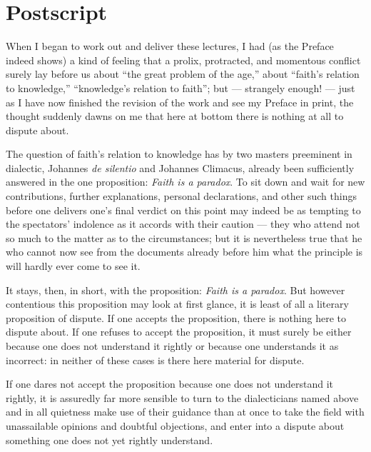 \documentclass[12pt,a4paper]{book}
\begin{document}
\chapter*{Postscript}
\label{ch:efterskrift}

\begingroup\small

When I began to work out and deliver these lectures, I had (as the Preface indeed shows) a kind of
feeling that a prolix, protracted, and momentous conflict surely lay before us about ``the great problem
of the age,'' about ``faith's relation to knowledge,'' ``knowledge's relation to faith''; but ---
strangely enough! --- just as I have now finished the revision of the work and see my Preface in print,
the thought suddenly dawns on me that here at bottom there is nothing at all to dispute about.

The question of faith's relation to knowledge has by two masters preeminent in dialectic, Johannes
\textit{de silentio} and Johannes Climacus, already been sufficiently answered in the one proposition:
\emph{Faith is a paradox}. To sit down and wait for new contributions, further explanations, personal
declarations, and other such things before one delivers one's final verdict on this point may indeed be
as tempting to the spectators' indolence as it accords with their caution --- they who attend not so much
to the matter as to the circumstances; but it is nevertheless true that he who cannot now see from the
documents already before him what the principle is will hardly ever come to see it.

It stays, then, in short, with the proposition: \emph{Faith is a paradox}. But however contentious this
proposition may look at first glance, it is least of all a literary proposition of dispute. If one
accepts the proposition, there is nothing here to dispute about. If one refuses to accept the proposition,
it must surely be either because one does not understand it rightly or because one understands it as
incorrect: in neither of these cases is there here material for dispute.

If one dares not accept the proposition because one does not understand it rightly, it is assuredly far
more sensible to turn to the dialecticians named above and in all quietness make use of their guidance
than at once to take the field with unassailable opinions and doubtful objections, and enter into a
dispute about something one does not yet rightly understand.
\end{document}
